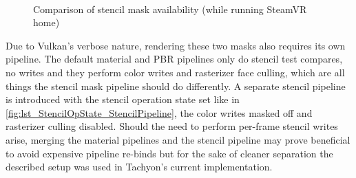 \begin{figure}[h]
  \centering
  \hspace*{\fill}
  \hfill
  \hspace*{\fill}
     \\
  \hspace*{\fill}
  \hfill
  \hspace*{\fill}
     \caption{Comparison of stencil mask availability (while running SteamVR home)}
     \label{fig:empty_mask}
\end{figure}

Due to Vulkan's verbose nature, rendering these two masks also requires its own pipeline. The default material and PBR pipelines only do stencil test compares, no writes and they perform color writes and rasterizer face culling, which are all things the stencil mask pipeline should do differently. A separate stencil pipeline is introduced with the stencil operation state set like in \autoref{fig:lst_StencilOpState_StencilPipeline}, the color writes masked off and rasterizer culling disabled. Should the need to perform per-frame stencil writes arise, merging the material pipelines and the stencil pipeline may prove beneficial to avoid expensive pipeline re-binds but for the sake of cleaner separation the described setup was used in \gls{Tachyon}'s current implementation. 

